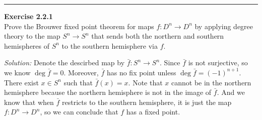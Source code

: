 \documentclass[a4paper, 12pt]{article}
\newenvironment{problem}[2][Exercise]
    { \begin{mdframed}[backgroundcolor=gray!20] \textbf{#1 #2} \\}
    {  \end{mdframed}}
\newenvironment{solution}
    {\textit{Solution:}}
    {}
\begin{document}
\noindent\rule{7in}{2.8pt}
\begin{problem}{2.2.1}
Prove the Brouwer fixed point theorem for maps \(f:D^n\rightarrow D^n\) by applying degree theory to the map \(S^n\rightarrow S^n\) that sends both the northern and southern hemispheres 
of \(S^n\) to the southern hemisphere via \(f\). 	
\end{problem}
\begin{solution}
Denote the descirbed map by \(\bar{f}:S^n\rightarrow S^n\). Since \(\bar{f}\) is not surjective, so we know \(\deg \bar{f}=0\). Moreover, \(\bar{f}\) has no fix point unless \(\deg \bar{f}=(-1)^{n+1}\). There 
exist \(x\in S^n\) such that \(\bar{f}(x)=x\). Note that \(x\) cannot be in the northern hemisphere because the northern hemisphere is not in the image of \(\bar{f}\). And we know that when \(\bar{f}\) restricts to the southern hemisphere, 
it is just the map \(f:D^n\rightarrow D^n\), so we can conclude that \(f\) has a fixed point. 
\end{solution}
\end{document}
